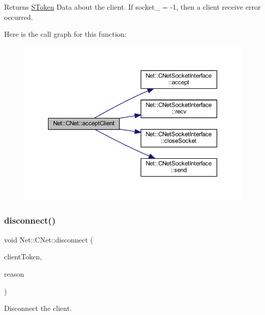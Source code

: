 \begin{DoxyReturn}{Returns}
\mbox{\hyperlink{struct_net_1_1_s_token}{S\+Token}} Data about the client. If socket\+\_\+ = -\/1, then a client receive error occurred. 
\end{DoxyReturn}
Here is the call graph for this function\+:
\nopagebreak
\begin{figure}[H]
\begin{center}
\leavevmode
\includegraphics[width=350pt]{class_net_1_1_c_net_a802a6ab154226caaa8d70423374b8034_cgraph}
\end{center}
\end{figure}
\mbox{\label{class_net_1_1_c_net_a7f66009e63ed53b541331143bb2f4bfb}} 
\subsubsection{\texorpdfstring{disconnect()}{disconnect()}}
{\footnotesize\ttfamily void Net\+::\+C\+Net\+::disconnect (\begin{DoxyParamCaption}\item[{\mbox{\hyperlink{struct_net_1_1_s_token}{S\+Token}} \&}]{client\+Token,  }\item[{Disconnect\+Reason}]{reason }\end{DoxyParamCaption})}



Disconnect the client. 


